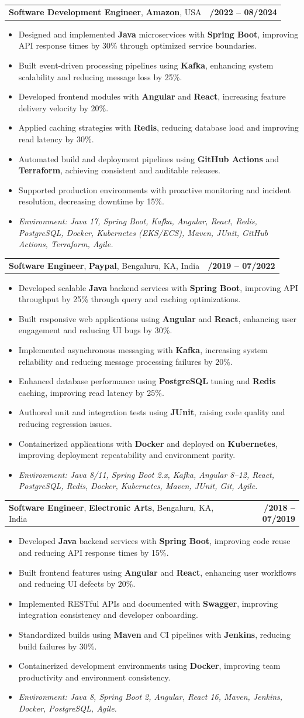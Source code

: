 \documentclass[letterpaper,11pt]{article}
\makeatletter
\newcommand{\resumeItem}[1]{
  \item\footnotesize{
    {#1 \vspace{-2pt}}
  }
}
\newcommand{\resumeSubheading}[4]{
  \vspace{-2pt}\item
    \begin{tabular*}{1.0\textwidth}[t]{l@{\extracolsep{\fill}}r}
      \textbf{\fontsize{10pt}{14pt}\selectfont #3}, \textbf{\fontsize{10pt}{14pt}\selectfont #1}, \fontsize{10pt}{14pt}\selectfont #4 & \textbf{\fontsize{10pt}{14pt}\selectfont #2} \\
    \end{tabular*}\vspace{-7pt}
}
\newcommand{\resumeItemListStart}{\begin{itemize}[leftmargin=*]}
\newcommand{\resumeItemListEnd}{\end{itemize}\vspace{-5pt}}
\makeatother
\begin{document}
\resumeSubheading
{Amazon}{10/2022 -- 08/2024}
{Software Development Engineer}{USA}
\resumeItemListStart
  \resumeItem{Designed and implemented \textbf{Java} microservices with \textbf{Spring Boot}, improving API response times by 30\% through optimized service boundaries.}
  \resumeItem{Built event-driven processing pipelines using \textbf{Kafka}, enhancing system scalability and reducing message loss by 25\%.}
  \resumeItem{Developed frontend modules with \textbf{Angular} and \textbf{React}, increasing feature delivery velocity by 20\%.}
  \resumeItem{Applied caching strategies with \textbf{Redis}, reducing database load and improving read latency by 30\%.}
  \resumeItem{Automated build and deployment pipelines using \textbf{GitHub Actions} and \textbf{Terraform}, achieving consistent and auditable releases.}
  \resumeItem{Supported production environments with proactive monitoring and incident resolution, decreasing downtime by 15\%.}
  \resumeItem{\textit{Environment: Java 17, Spring Boot, Kafka, Angular, React, Redis, PostgreSQL, Docker, Kubernetes (EKS/ECS), Maven, JUnit, GitHub Actions, Terraform, Agile.}}
\resumeItemListEnd

\resumeSubheading
{Paypal}{08/2019 -- 07/2022}
{Software Engineer}{Bengaluru, KA, India}
\resumeItemListStart
  \resumeItem{Developed scalable \textbf{Java} backend services with \textbf{Spring Boot}, improving API throughput by 25\% through query and caching optimizations.}
  \resumeItem{Built responsive web applications using \textbf{Angular} and \textbf{React}, enhancing user engagement and reducing UI bugs by 30\%.}
  \resumeItem{Implemented asynchronous messaging with \textbf{Kafka}, increasing system reliability and reducing message processing failures by 20\%.}
  \resumeItem{Enhanced database performance using \textbf{PostgreSQL} tuning and \textbf{Redis} caching, improving read latency by 25\%.}
  \resumeItem{Authored unit and integration tests using \textbf{JUnit}, raising code quality and reducing regression issues.}
  \resumeItem{Containerized applications with \textbf{Docker} and deployed on \textbf{Kubernetes}, improving deployment repeatability and environment parity.}
  \resumeItem{\textit{Environment: Java 8/11, Spring Boot 2.x, Kafka, Angular 8--12, React, PostgreSQL, Redis, Docker, Kubernetes, Maven, JUnit, Git, Agile.}}
\resumeItemListEnd

\resumeSubheading
{Electronic Arts}{01/2018 -- 07/2019}
{Software Engineer}{Bengaluru, KA, India}
\resumeItemListStart
  \resumeItem{Developed \textbf{Java} backend services with \textbf{Spring Boot}, improving code reuse and reducing API response times by 15\%.}
  \resumeItem{Built frontend features using \textbf{Angular} and \textbf{React}, enhancing user workflows and reducing UI defects by 20\%.}
  \resumeItem{Implemented RESTful APIs and documented with \textbf{Swagger}, improving integration consistency and developer onboarding.}
  \resumeItem{Standardized builds using \textbf{Maven} and CI pipelines with \textbf{Jenkins}, reducing build failures by 30\%.}
  \resumeItem{Containerized development environments using \textbf{Docker}, improving team productivity and environment consistency.}
  \resumeItem{\textit{Environment: Java 8, Spring Boot 2, Angular, React 16, Maven, Jenkins, Docker, PostgreSQL, Agile.}}
\resumeItemListEnd
\end{document}

